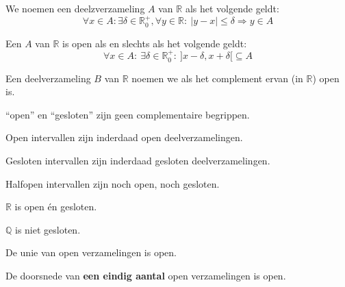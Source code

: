 \documentclass[main.tex]{subfiles}
\begin{document}
\begin{de}
  We noemen een deelzverzameling $A$ van $\mathbb{R}$  als het volgende geldt:
  \[ \forall x\in A: \exists \delta \in \mathbb{R}_{0}^{+}, \forall y\in \mathbb{R}:\ |y-x| \le \delta \Rightarrow y\in A \]
\end{de}

\begin{st}
  Een $A$ van $\mathbb{R}$ is open als en slechts als het volgende geldt:
  \[ \forall x\in A:\ \exists \delta \in \mathbb{R}_{0}^{+}:\ ]x-\delta,x+\delta[ \subseteq A \]
\end{st}

\begin{de}
  Een deelverzameling $B$ van $\mathbb{R}$ noemen we  als het complement ervan (in $\mathbb{R}$) open is.
\end{de}

\begin{opm}
  ``open'' en ``gesloten'' zijn geen complementaire begrippen.
\end{opm}

\begin{st}
  Open intervallen zijn inderdaad open deelverzamelingen.
\end{st}
\begin{st}
  Gesloten intervallen zijn inderdaad gesloten deelverzamelingen.
\end{st}

\begin{st}
  Halfopen intervallen zijn noch open, noch gesloten.
\end{st}

\begin{st}
  $\mathbb{R}$ is open \'en gesloten.
\end{st}

\begin{st}
  $\mathbb{Q}$ is niet gesloten.
\end{st}

\begin{pr}
  De unie van open verzamelingen is open.
\end{pr}

\begin{pr}
  De doorsnede van \textbf{een eindig aantal} open verzamelingen is open.
\end{pr}
\end{document}
